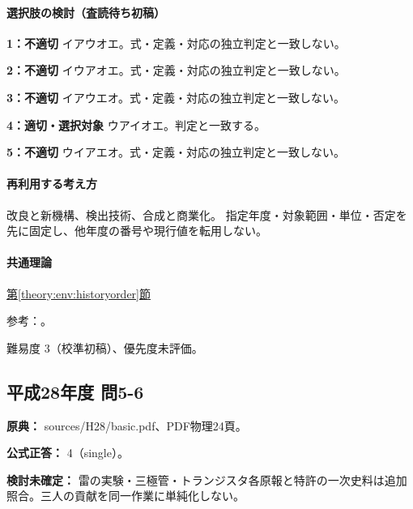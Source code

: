 \paragraph{選択肢の検討（査読待ち初稿）}\mbox{}\par

\noindent\textbf{1：不適切} イアウオエ。式・定義・対応の独立判定と一致しない。\par

\noindent\textbf{2：不適切} イウアオエ。式・定義・対応の独立判定と一致しない。\par

\noindent\textbf{3：不適切} イアウエオ。式・定義・対応の独立判定と一致しない。\par

\noindent\textbf{4：適切・選択対象} ウアイオエ。判定と一致する。\par

\noindent\textbf{5：不適切} ウイアエオ。式・定義・対応の独立判定と一致しない。\par

\paragraph{再利用する考え方} 改良と新機構、検出技術、合成と商業化。 指定年度・対象範囲・単位・否定を先に固定し、他年度の番号や現行値を転用しない。

\paragraph{共通理論} \hyperref[theory:env:historyorder]{第\ref*{theory:env:historyorder}節}

\par 参考：\cite{env58_steam,env58_nylon}。

\par 難易度 3（校準初稿）、優先度未評価。

\subsection{平成28年度 問5-6}
\label{q:h28-reg-basic-5-6}

\noindent\textbf{原典：} sources/H28/basic.pdf、PDF物理24頁。

\textbf{公式正答：} 4（single）。

\par\textbf{検討未確定：} 雷の実験・三極管・トランジスタ各原報と特許の一次史料は追加照合。三人の貢献を同一作業に単純化しない。


